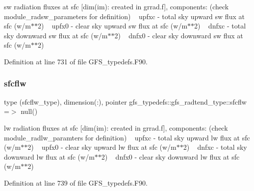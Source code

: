 sw radiation fluxes at sfc [dim(im)\+: created in grrad.\+f], components\+: (check module\+\_\+radsw\+\_\+parameters for definition) ~\newline
 upfxc -\/ total sky upward sw flux at sfc (w/m$\ast$$\ast$2) ~\newline
 upfx0 -\/ clear sky upward sw flux at sfc (w/m$\ast$$\ast$2) ~\newline
 dnfxc -\/ total sky downward sw flux at sfc (w/m$\ast$$\ast$2) ~\newline
 dnfx0 -\/ clear sky downward sw flux at sfc (w/m$\ast$$\ast$2) 



Definition at line 731 of file G\+F\+S\+\_\+typedefs.\+F90.

\mbox{\label{structgfs__typedefs_1_1gfs__radtend__type_a40ebc1e3f4d9f64c9a93b88ac2032698}} 
\subsubsection{sfcflw}
{\footnotesize\ttfamily type (sfcflw\+\_\+type), dimension(\+:), pointer gfs\+\_\+typedefs\+::gfs\+\_\+radtend\+\_\+type\+::sfcflw =$>$ null()}



lw radiation fluxes at sfc [dim(im)\+: created in grrad.\+f], components\+: (check module\+\_\+radlw\+\_\+paramters for definition) ~\newline
 upfxc -\/ total sky upward lw flux at sfc (w/m$\ast$$\ast$2) ~\newline
 upfx0 -\/ clear sky upward lw flux at sfc (w/m$\ast$$\ast$2) ~\newline
 dnfxc -\/ total sky downward lw flux at sfc (w/m$\ast$$\ast$2) ~\newline
 dnfx0 -\/ clear sky downward lw flux at sfc (w/m$\ast$$\ast$2) 



Definition at line 739 of file G\+F\+S\+\_\+typedefs.\+F90.

\mbox{\label{structgfs__typedefs_1_1gfs__radtend__type_a4226d950c1c61b2404e2fcffe295094f}} 
